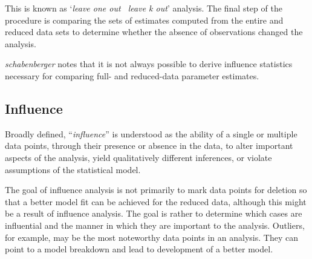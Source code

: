 \documentclass[]{article}
\begin{document}
	This is known as `\textit{leave one out \ leave k
		out}' analysis. The final step of the procedure is comparing the
	sets of estimates computed from the entire and reduced data sets
	to determine whether the absence of observations changed the
	analysis.
	
	\textit{schabenberger} notes that it is not always possible to
	derive influence statistics necessary for comparing full- and
	reduced-data parameter estimates. 
	
	
	\subsection{Influence}
	Broadly
	defined, ``\textit{influence}” is understood as the ability of a single or multiple data points, through their presence
	or absence in the data, to alter important aspects of the analysis, yield qualitatively different inferences, or
	violate assumptions of the statistical model. 
	
	
	The goal of influence analysis is not primarily to mark data
	points for deletion so that a better model fit can be achieved for the reduced data, although this might be a
	result of influence analysis. The goal is rather to determine which cases are influential and the manner in
	which they are important to the analysis. Outliers, for example, may be the most noteworthy data points in
	an analysis. They can point to a model breakdown and lead to development of a better model.
	
	
	
\end{document}
